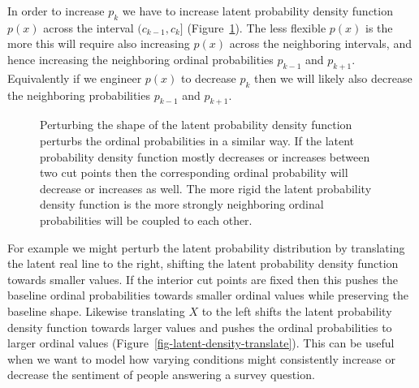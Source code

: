 \documentclass[
  letterpaper,
  DIV=11,
  numbers=noendperiod]{scrartcl}
\begin{document}
In order to increase \(p_{k}\) we have to increase latent probability
density function \(p(x)\) across the interval \((c_{k - 1}, c_{k}]\)
(Figure~\ref{fig-perturb-interval-probs}). The less flexible \(p(x)\) is
the more this will require also increasing \(p(x)\) across the
neighboring intervals, and hence increasing the neighboring ordinal
probabilities \(p_{k - 1}\) and \(p_{k + 1}\). Equivalently if we
engineer \(p(x)\) to decrease \(p_{k}\) then we will likely also
decrease the neighboring probabilities \(p_{k - 1}\) and \(p_{k + 1}\).

\begin{figure}


\caption{\label{fig-perturb-interval-probs}Perturbing the shape of the
latent probability density function perturbs the ordinal probabilities
in a similar way. If the latent probability density function mostly
decreases or increases between two cut points then the corresponding
ordinal probability will decrease or increases as well. The more rigid
the latent probability density function is the more strongly neighboring
ordinal probabilities will be coupled to each other.}

\end{figure}%

For example we might perturb the latent probability distribution by
translating the latent real line to the right, shifting the latent
probability density function towards smaller values. If the interior cut
points are fixed then this pushes the baseline ordinal probabilities
towards smaller ordinal values while preserving the baseline shape.
Likewise translating \(X\) to the left shifts the latent probability
density function towards larger values and pushes the ordinal
probabilities to larger ordinal values
(Figure~\ref{fig-latent-density-translate}). This can be useful when we
want to model how varying conditions might consistently increase or
decrease the sentiment of people answering a survey question.
\end{document}
